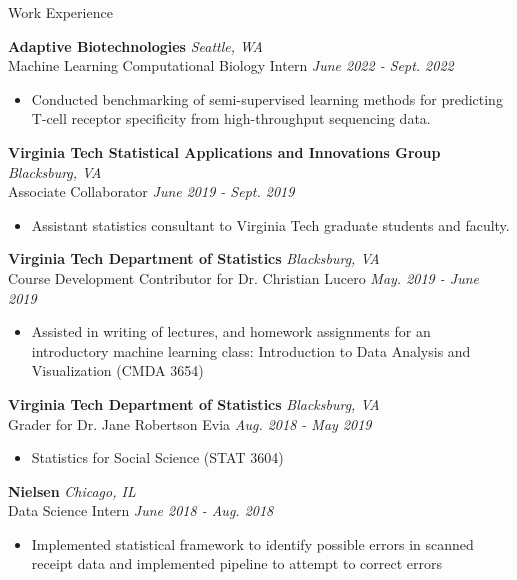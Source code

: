 \documentclass{resume} %
\begin{document}

\begin{rSection}{Work Experience}

{\bf Adaptive Biotechnologies} \hfill {\em Seattle, WA} \\
{Machine Learning Computational Biology Intern} \hfill {\em June 2022 - Sept. 2022}
\begin{itemize}
    \item Conducted benchmarking of semi-supervised learning methods for predicting T-cell receptor specificity from high-throughput sequencing data.
\end{itemize}

{\bf Virginia Tech Statistical Applications and Innovations Group} \hfill {\em Blacksburg, VA} \\
{Associate Collaborator} \hfill {\em June 2019 - Sept. 2019}
\begin{itemize}
    \item Assistant statistics consultant to Virginia Tech graduate students and faculty.
\end{itemize}

{\bf Virginia Tech Department of Statistics} \hfill {\em Blacksburg, VA} \\
{Course Development Contributor for Dr. Christian Lucero} \hfill {\em May. 2019 - June 2019}
\begin{itemize}
    \item Assisted in writing of lectures, and homework assignments for an introductory machine learning class: Introduction to Data Analysis and Visualization (CMDA 3654)
\end{itemize}

{\bf Virginia Tech Department of Statistics} \hfill {\em Blacksburg, VA} \\
{Grader for Dr. Jane Robertson Evia} \hfill {\em Aug. 2018 - May 2019}
\begin{itemize}
    \item Statistics for Social Science (STAT 3604)
\end{itemize}

{\bf Nielsen} \hfill {\em Chicago, IL} \\
{Data Science Intern} \hfill {\em June 2018 - Aug. 2018}
\begin{itemize}
    \item Implemented statistical framework to identify possible errors in scanned receipt data and implemented pipeline to attempt to correct errors
    \end{itemize}


\end{rSection}
\end{document}
